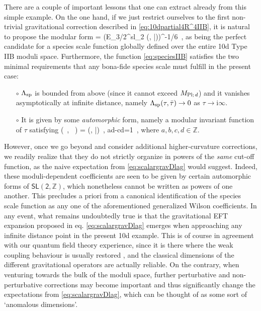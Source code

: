 There are a couple of important lessons that one can extract already from this simple example. On the one hand, if we just restrict ourselves to the first non-trivial gravitational correction described in \eqref{eq:10dpartial4R^4IIB}, it is natural to propose the modular form
%
\beq\label{eq:speciesIIB}
\LSP = \left(E_{3/2}^{sl_2} (\tau, \bar \tau)\right)^{-1/6}\, ,
\eeq
%
as being the perfect candidate for a species scale function globally defined over the entire 10d Type IIB moduli space. Furthermore, the function \eqref{eq:speciesIIB} satisfies the two minimal requirements that any bona-fide species scale must fulfill in the present case:
%
\begin{itemize}
    \item[$\circ$] $\Lambda_{\text{sp}}$ is bounded from above (since it cannot exceed $M_{\text{Pl;}\, d}$) and it vanishes asymptotically at infinite distance, namely $\Lambda_{\text{sp}} (\tau, \bar \tau) \to 0$ as $\tau \to \text{i} \infty$.

    \item[$\circ$] It is given by some \emph{automorphic} form, namely a modular invariant function of $\tau$ satisfying
%
\beq
 \notag \LSP \left(\, , \,  \right) = \LSP (\tau, \bar \tau)\, , \qquad ad-cd=1\, ,
\eeq
%
where $a,b,c,d \in \mathbb{Z}$.
\end{itemize}
%
However, once we go beyond and consider additional higher-curvature corrections, we readily realize that they do not strictly organize in powers of the \emph{same} cut-off function, as the naive expectation from \eqref{eq:scalargravDlag} would suggest. Indeed, these moduli-dependent coefficients are seen to be given by certain automorphic forms of $\mathsf{SL(2,\mathbb{Z})}$, which nonetheless cannot be written as powers of one another. This precludes a priori from a canonical identification of the species scale function as any one of the aforementioned generalized Wilson coefficients. In any event, what remains undoubtedly true is that the gravitational EFT expansion proposed in eq. \eqref{eq:scalargravDlag} emerges when approaching any infinite distance point in the present 10d example. This is of course in agreement with our quantum field theory experience, since it is there where the weak coupling behaviour is usually restored \cite{Gendler:2020dfp}, and the classical dimensions of the different gravitational operators are actually reliable. On the contrary, when venturing towards the bulk of the moduli space, further perturbative and non-perturbative corrections may become important and thus significantly change the expectations from \eqref{eq:scalargravDlag}, which can be thought of as some sort of `anomalous dimensions'.

